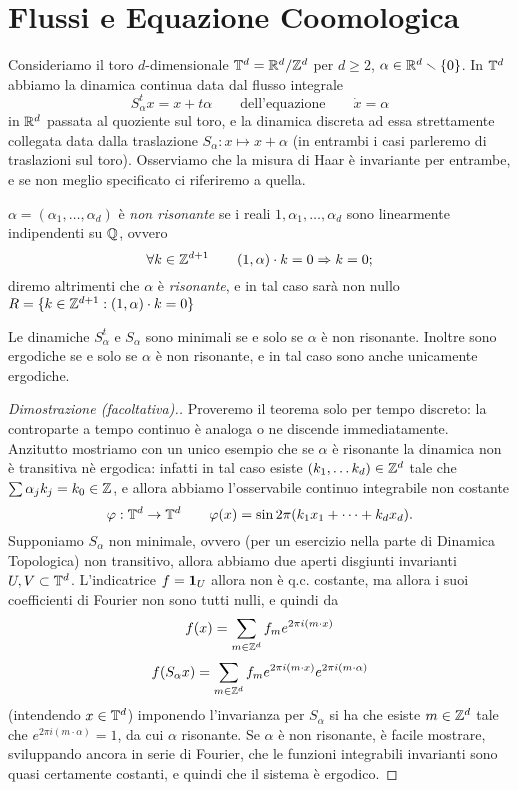 \section{Flussi e Equazione Coomologica}

Consideriamo il toro $d$-dimensionale $\mathbb{T}^d=\mathbb{R}^d/\mathbb{Z}^d$ per $d\geq 2$, $\alpha\in\mathbb{R}^d\smallsetminus \{0\}$. In $\mathbb{T}^d$ abbiamo la dinamica continua data dal flusso integrale 
\[S^t_\alpha x=x+t\alpha \qquad \mbox{dell'equazione} \qquad \dot x=\alpha\]
in $\mathbb{R}^d$ passata al quoziente sul toro, e la dinamica discreta ad essa strettamente collegata data dalla traslazione 
$S_\alpha: x\mapsto x+\alpha$ (in entrambi i casi parleremo di traslazioni sul toro). 
Osserviamo che la misura di Haar è invariante per entrambe, e se non meglio specificato ci riferiremo a quella.

\begin{defi} $\alpha=(\alpha_1,\dots,\alpha_d)$ è \emph{non risonante} se i reali $1,\alpha_1,\dots,\alpha_d$ sono linearmente indipendenti su $\mathbb{Q}$, ovvero
 \[\forall k\in \mathbb{Z}^{d+1} \qquad (1,\alpha)\cdot k=0 \Rightarrow k=0;\]
 diremo altrimenti che $\alpha$ è \emph{risonante}, e in tal caso sarà non nullo $R=\{k\in\mathbb{Z}^{d+1}:(1,\alpha)\cdot k=0\}$
\end{defi}

\begin{teo} Le dinamiche $S^t_\alpha$ e $S_\alpha$ sono minimali se e solo se $\alpha$ è non risonante. 
Inoltre sono ergodiche se e solo se $\alpha$ è non risonante, e in tal caso sono anche unicamente ergodiche.\end{teo}

\begin{proof}[Dimostrazione (facoltativa).]
 Proveremo il teorema solo per tempo discreto: la controparte a tempo continuo è analoga o ne discende immediatamente. 
 Anzitutto mostriamo con un unico esempio che se $\alpha$ è risonante la dinamica non è transitiva nè ergodica: 
 infatti in tal caso esiste $(k_1,\dots k_d)\in\mathbb{Z}^d$ tale che $\sum\alpha_j k_j=k_0\in\mathbb{Z}$, e allora abbiamo l'osservabile continuo integrabile non costante
 \[\varphi:\mathbb{T}^d\rightarrow \mathbb{T}^d \qquad \varphi(x)=\sin 2\pi(k_1x_1+\dots+k_dx_d).\]
 Supponiamo $S_\alpha$ non minimale, ovvero (per un esercizio nella parte di Dinamica Topologica) non transitivo, 
 allora abbiamo due aperti disgiunti invarianti $U,V\subset \mathbb{T}^d$. L'indicatrice $f=\bm{1}_U$ allora non è q.c. costante, ma allora i suoi coefficienti di Fourier
 non sono tutti nulli, e quindi da
 \[f(x)=\sum_{m\in \mathbb{Z}^d} f_m e^{2\pi i (m\cdot x)}\]
 \[f(S_\alpha x )=\sum_{m\in \mathbb{Z}^d} f_m e^{2\pi i (m\cdot x)} e^{2\pi i (m\cdot \alpha)}\]
 (intendendo $x\in \mathbb{T}^d$) imponendo l'invarianza per $S_\alpha$ si ha che esiste $m\in\mathbb{Z}^d$ tale che $e^{2\pi i (m\cdot \alpha)}=1$, da cui $\alpha$ risonante.
 Se $\alpha$ è non risonante, è facile mostrare, sviluppando ancora in serie di Fourier, che le funzioni integrabili invarianti sono quasi certamente costanti,
 e quindi che il sistema è ergodico.
\end{proof}

